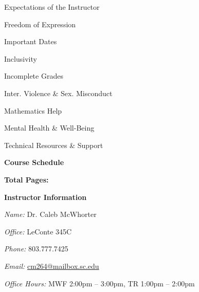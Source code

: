 \documentclass[11pt,letterpaper]{article}
\makeatletter
\newcommand{\instructor}{Dr. Caleb McWhorter}
\newcommand{\office}{LeConte 345C}
\newcommand{\phone}{803.777.7425}
\newcommand{\email}{cm264@mailbox.sc.edu}
\newcommand{\officehours}{MWF 2:00pm -- 3:00pm, TR 1:00pm -- 2:00pm}
\makeatother
\begin{document}
\begin{minipage}[t]{0.45\textwidth}
\hspace{0.3cm} Expectations of the Instructor \dotfill \pageref{univ_instructorexp} \par
\hspace{0.3cm} Freedom of Expression \dotfill \pageref{univ_freedexpression} \par
\hspace{0.3cm} Important Dates \dotfill \pageref{univ_dates} \par
\hspace{0.3cm} Inclusivity \dotfill \pageref{univ_inclusion} \par
\hspace{0.3cm} Incomplete Grades \dotfill \pageref{univ_incomplete} \par
\hspace{0.3cm} Inter. Violence \& Sex. Misconduct \dotfill \pageref{univ_viosexmis} \par
\hspace{0.3cm} Mathematics Help \dotfill \pageref{univ_mathhelp} \par
\hspace{0.3cm} Mental Health \& Well-Being \dotfill \pageref{univ_mental} \par
\hspace{0.3cm} Technical Resources \& Support \dotfill \pageref{univ_techsupport} \par
{\bfseries\color{scred} Course Schedule} \dotfill \pageref{schd} \par
\hfill {\bfseries\color{scred} Total Pages:} \pageref*{LastPage}
\end{minipage}
\pvspace{0.8cm}




\vspace{-0.2cm}  \vspace{-0.3cm}


{\bfseries\color{scred} Instructor Information} \par
\textit{Name:} \instructor \par
\textit{Office:} \office \par
\textit{Phone:} \phone \par
\textit{Email:} \href{mailto:\email}{\email} \par
\textit{Office Hours:} \officehours \pvspace{0.3cm}
\end{document}
